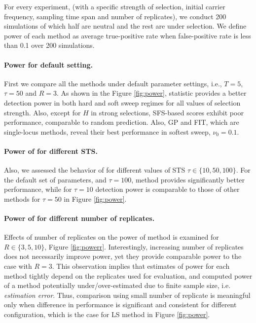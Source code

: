 \documentclass[11pt]{article}
\def\comale{\text{COMALE }}
\begin{document}
For every experiment, (with a specific strength of selection, initial carrier 
frequency, 
sampling time span and number of replicates), we conduct 200 simulations of 
which half are neutral and the rest are under selection. We define power of 
each method as average true-positive rate when 
false-positive rate is less than 0.1 over 200 simulations.


\paragraph{Power for default setting.}
First we compare all the methods under default parameter settings, i.e., 
$T=5$, $\tau=50$ and $R=3$. As shown in the Figure \ref{fig:power}, \comale
statistic provides a better detection power in both hard and soft sweep regimes 
for all values of selection strength. 
Also, except for $H$ in strong selections, SFS-based scores exhibit poor 
performance, comparable to random prediction. 
Also, GP and FIT, which are single-locus methods, reveal 
their best performance in softest sweep, $\nu_0=0.1$.

\paragraph{Power of \comale for different STS.}
Also, we assessed the behavior of \comale for different values of STS
$\tau\in\{10,50,100\}$. For the default set of parameters, and $\tau=100$, 
\comale method provides significantly better performance, while for $\tau=10$ 
detection 
power is comparable to those of other methods for $\tau=50$ in Figure 
\ref{fig:power}. 

\paragraph{Power of \comale for different number of replicates.}
Effects of number of replicates on the power of \comale method is 
examined for $R\in\{3,5,10\}$, Figure \ref{fig:powerr}. Interestingly, 
increasing number of replicates does not necessarily improve power, yet they 
provide comparable power to the case with $R=3$. This observation implies that 
estimates of power for each method tightly depend on the replicates used for 
evaluation, and computed power of a method potentially under/over-estimated due 
to finite sample size, i.e. \emph{estimation error}. Thus, comparison using 
small number of replicate is meaningful only when difference in performance is 
significant and consistent for different configuration, which is the case for 
LS method in Figure \ref{fig:power}. 
\end{document}
